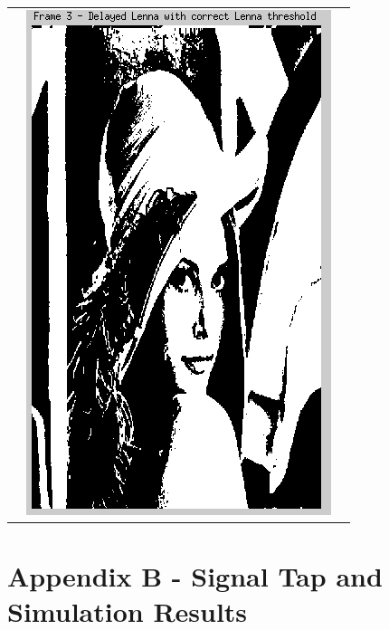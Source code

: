 \documentclass[12pt]{article}
\begin{document}
\begin{table}[h!]
\begin{center}
\begin{tabular} {c c c}
&
  \includegraphics[scale=.5]{Images/DelayedThreshold/frame3.png}
\end{tabular}
\end{center}
\label{fig:lenna_thresh_shark}
\end{table}
  
\newpage
  \section{Appendix B - Signal Tap and Simulation Results}
\end{document}

